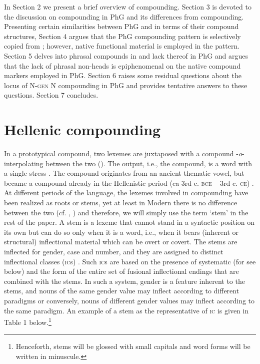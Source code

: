 \documentclass[output=paper]{LSP/langsci}
\begin{document}
In Section 2 we present a brief overview of  compounding. Section 3 is devoted to the discussion on compounding in PhG and its differences from  compounding. Presenting certain similarities between PhG and  in terms of their compound structures, Section 4 argues that the PhG compounding pattern is selectively copied from ; however, native functional  material is employed in the pattern. Section 5 delves into phrasal compounds in  and lack thereof in PhG and argues that the lack of phrasal non-heads is epiphenomenal on the native compound markers employed in PhG. Section 6 raises some residual questions  about the locus of N-\textsc{gen} N compounding in PhG and provides tentative answers to these questions. Section 7 concludes.

\section{Hellenic compounding}

In a prototypical  compound, two lexemes are juxtaposed with a compound  -\textit{o}- interpolating between the two (\citealt{Ralli2008}). The output, i.e., the compound, is a  word with a single stress \citep{NesporRalli1994,NesporRalli1996}. The compound  originates from an ancient thematic vowel, but became a compound  already in the Hellenistic period (ca 3rd c. \textsc{bce} -- 3rd c. \textsc{ce}) \citep{AnastasiadiSymeonidi1983,RalliRaftopoulou1999,Ralli2007,Ralli2013moderngreek}. At different periods of the language, the lexemes involved in compounding have been realized as roots or stems, yet at least in Modern  there is no difference between the two (cf. \citealt[23]{Ralli2005}, \citealt[8]{Ralli2013moderngreek}) and therefore, we will simply use the term `stem' in the rest of the paper. A stem is a lexeme that cannot stand in a syntactic position on its own but can do so only when it is a word, i.e., when it bears (inherent or structural) inflectional material which can be overt or covert. The stems are inflected for gender, case and number, and they are assigned to distinct inflectional classes (\textsc{ic}s) \citep{Ralli2000,Ralli2005}. Such \textsc{ic}s are based on the presence of systematic  (for  see below) and the form of the entire set of fusional inflectional endings that are combined with the stems. In such a system, gender is a feature inherent to the stems, and nouns of the same gender value may inflect according to different paradigms or conversely, nouns of different gender values may inflect according to the same paradigm. An example of a stem as the representative of \textsc{ic} is given in Table 1 below.\footnote{Henceforth, stems will be glossed with small capitals and word forms will be written in minuscule.}
\end{document}
